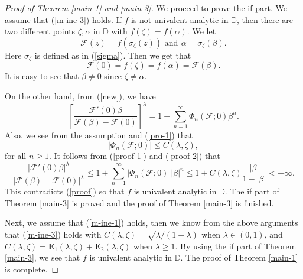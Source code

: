 \documentclass[10pt]{amsart}
\theoremstyle{definition}
\theoremstyle{remark}
\numberwithin{equation}{section}
\begin{document}
\begin{proof}[Proof of Theorem \ref{main-1} and \ref{main-3}]
We proceed to prove the  if part.  We assume that (\ref{m-ine-3}) holds. If $f$ is not univalent analytic in $\mathbb{D}$, then there are two different points $\zeta, \alpha$ in $\mathbb{D}$ with $f(\zeta)=f(\alpha)$. We let
$$\mathcal{F}(z)=f(\sigma_{\zeta}(z))\,\, {\text{and}}\,\ \alpha=\sigma_{\zeta}(\beta).$$
Here $\sigma_{\zeta}$ is defined as in (\ref{sigma}). Then we get that 
\begin{equation}\label{proof}\mathcal{F}(0)=f(\zeta)=f(\alpha)=\mathcal{F}(\beta). \end{equation}
It is easy to see that $\beta \neq 0$ since $\zeta \neq \alpha$.

On the other hand, from (\ref{new}), we have 
\begin{equation}\label{proof-1}
\left[\frac{{\mathcal{F}}'(0)\beta}{\mathcal{F}(\beta)-\mathcal{F}(0)}\right]^{\lambda}=1+\sum_{n=1}^{\infty}\Phi_n(\mathcal{F}; 0){\beta}^n.
\end{equation}
Also, we see from the assumption and (\ref{pro-1}) that
\begin{equation}\label{proof-2}
|\Phi_{n}(\mathcal{F}; 0)|\leq C(\lambda, \zeta),
\end{equation} 
for all $n\geq 1.$
It follows from (\ref{proof-1}) and (\ref{proof-2}) that  
\begin{equation}
\frac{|{\mathcal{F}}'(0)\beta|^{\lambda}}{|\mathcal{F}(\beta)-\mathcal{F}(0)|^{\lambda}}\leq 1+\sum_{n=1}^{\infty}|\Phi_n(\mathcal{F}; 0)|{|\beta|}^n\leq 1+C(\lambda, \zeta)\frac{|\beta|}{1-|\beta|} <+\infty. \nonumber
\end{equation}
This contradicts (\ref{proof}) so that $f$ is univalent analytic in $\mathbb{D}$.  The if part of Theorem \ref{main-3} is proved and the proof of Theorem \ref{main-3} is finished.

Next, we assume that (\ref{m-ine-1}) holds, then we know from the above arguments that  (\ref{m-ine-3}) holds with $C(\lambda, \zeta)=\sqrt{\lambda/(1-\lambda)}$ when $\lambda\in (0,1)$, 
and  $C(\lambda, \zeta)=\mathbf{E}_1(\lambda, \zeta)+\mathbf{E}_2(\lambda, \zeta)$ when $\lambda\geq 1.$  By using the if part of Theorem \ref{main-3},  we see that $f$ is univalent analytic in $\mathbb{D}$. The proof of Theorem \ref{main-1} is complete. 
\end{proof}
\end{document}
